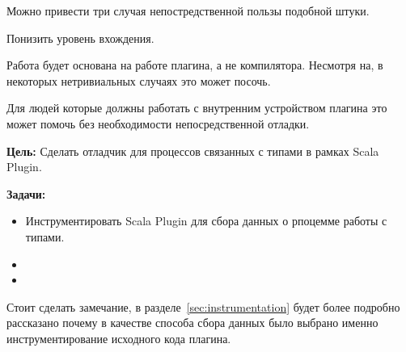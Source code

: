 Можно привести три случая непостредственной пользы подобной штуки.

Понизить уровень вхождения.

Работа будет основана на работе плагина, а не компилятора.
Несмотря на, в некоторых нетривиальных случаях это может посочь.

Для людей которые должны работать с внутренним устройством плагина это может
помочь без необходимости непосредственной отладки.

\textbf{Цель:}
Сделать отладчик для процессов связанных с типами в рамках Scala Plugin.

\textbf{Задачи:}
\begin{itemize}
  \item Инструментировать Scala Plugin для сбора данных о рпоцемме работы с типами.
  \item
  \item
\end{itemize}

Стоит сделать замечание, в разделе~\ref{sec:instrumentation} будет более подробно
рассказано почему в качестве способа сбора данных было выбрано именно
инструментирование исходного кода плагина.
